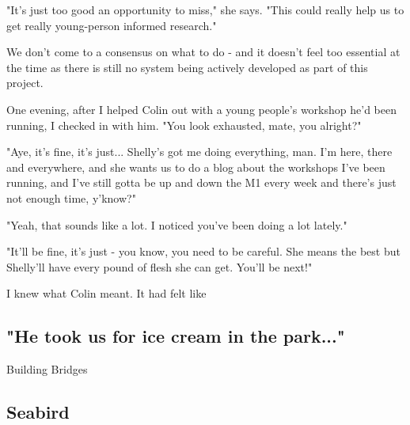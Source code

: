 "It's just too good an opportunity to miss," she says. "This could really help us to get really young-person informed research."

We don't come to a consensus on what to do - and it doesn't feel too essential at the time as there is still no system being actively developed as part of this project. 

One evening, after I helped Colin out with a young people's workshop he'd been running, I checked in with him. "You look exhausted, mate, you alright?"

"Aye, it's fine, it's just... Shelly's got me doing everything, man. I'm here, there and everywhere, and she wants us to do a blog about the workshops I've been running, and I've still gotta be up and down the M1 every week and there's just not enough time, y'know?"

"Yeah, that sounds like a lot. I noticed you've been doing a lot lately."

"It'll be fine, it's just - you know, you need to be careful. She means the best but Shelly'll have every pound of flesh she can get. You'll be next!"

I knew what Colin meant. It had felt like 




\subsection{"He took us for ice cream in the park..."}
Building Bridges





\subsection{Seabird}

